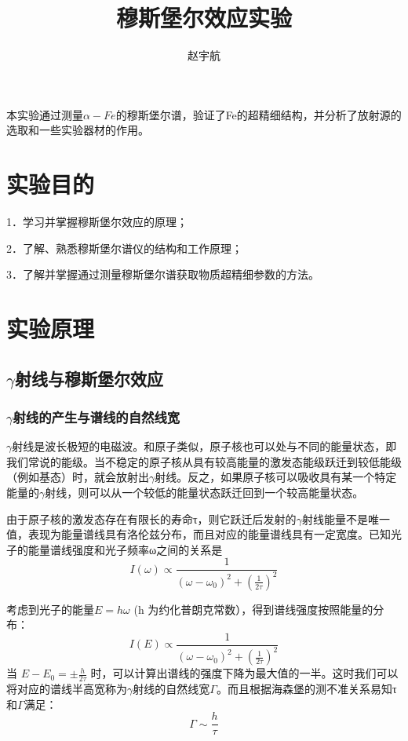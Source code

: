 \documentclass[hyperref]{ctexart}
\title{\textbf{穆斯堡尔效应实验}}
\author{\sffamily 赵宇航}
\date{}
\begin{document}
\maketitle
{}本实验通过测量$\alpha-Fe$的穆斯堡尔谱，验证了Fe的超精细结构，并分析了放射源的选取和一些实验器材的作用。\\	
\begin{multicols}{2}
	\section{实验目的}
	1．学习并掌握穆斯堡尔效应的原理；

	2．了解、熟悉穆斯堡尔谱仪的结构和工作原理；

	3．了解并掌握通过测量穆斯堡尔谱获取物质超精细参数的方法。
	\section{实验原理}
	
	\subsection{$\gamma$射线与穆斯堡尔效应}
	\subsubsection{$\gamma$射线的产生与谱线的自然线宽}
	$\gamma$射线是波长极短的电磁波。和原子类似，原子核也可以处与不同的能量状态，即我们常说的能级。当不稳定的原子核从具有较高能量的激发态能级跃迁到较低能级（例如基态）时，就会放射出$\gamma$射线。反之，如果原子核可以吸收具有某一个特定能量的$\gamma$射线，则可以从一个较低的能量状态跃迁回到一个较高能量状态。
	
	由于原子核的激发态存在有限长的寿命τ，则它跃迁后发射的$\gamma$射线能量不是唯一值，表现为能量谱线具有洛伦兹分布，而且对应的能量谱线具有一定宽度。已知光子的能量谱线强度和光子频率ω之间的关系是
	\begin{equation}
	I(\omega)\propto \frac{1}{(\omega-\omega_0)^2+(\frac{1}{2\tau})^2}
	\end{equation}
	
	考虑到光子的能量$E=h\omega$ (h 为约化普朗克常数），得到谱线强度按照能量的分布：
	\begin{equation}
	I(E)\propto \frac{1}{(\omega-\omega_0)^2+(\frac{1}{2\tau})^2}
	\end{equation}
	当 $E-E_0=\pm\frac{h}{2\tau}$ 时，可以计算出谱线的强度下降为最大值的一半。这时我们可以将对应的谱线半高宽称为$\gamma$射线的自然线宽$\Gamma$。而且根据海森堡的测不准关系易知τ和$\Gamma$满足：
	\begin{equation}
	\Gamma\sim \frac{h}{\tau}\label{kd}
	\end{equation}
	

\end{multicols}
\end{document}
